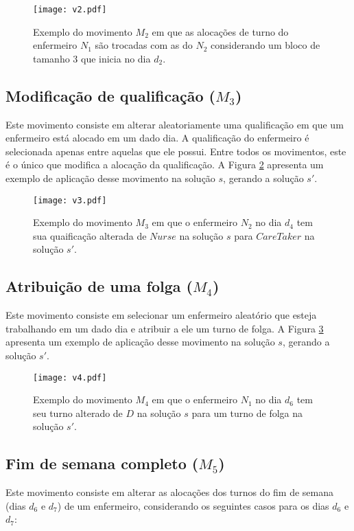 \documentclass[cic,tc, twoside]{iiufrgs}
\begin{document}
\begin{figure}[ht!]
\texttt{[image: v2.pdf]}
\centering
\caption{Exemplo do movimento $M_2$ em que as alocações de turno do enfermeiro $N_1$ são trocadas com as do $N_2$ considerando um bloco 
de tamanho 3 que inicia no dia $d_2$.} 
\label{fig:vizinhanca2}
\end{figure}

\subsection{Modificação de qualificação ($M_3$)}

Este movimento consiste em alterar aleatoriamente uma qualificação em que um enfermeiro está alocado em um dado dia.
A qualificação do enfermeiro é selecionada apenas entre aquelas que ele possui. Entre todos os movimentos, este é o único que modifica a alocação da qualificação. A Figura \ref{fig:vizinhanca3} apresenta um exemplo de aplicação desse movimento na solução $s$, gerando a solução $s'$. 


\begin{figure}[ht!]
\texttt{[image: v3.pdf]}
\centering
\caption{Exemplo do movimento $M_3$ em que o enfermeiro $N_2$ no dia $d_4$ tem sua quaificação alterada de $Nurse$ na solução $s$ para $CareTaker$ na solução $s'$.}
\label{fig:vizinhanca3}
\end{figure}

\subsection{Atribuição de uma folga ($M_4$)}
Este movimento consiste em selecionar um enfermeiro aleatório que esteja trabalhando em um dado dia e atribuir a ele um turno de folga.
A Figura \ref{fig:vizinhanca4} apresenta um exemplo de aplicação desse movimento na solução $s$, gerando a solução $s'$. 

\begin{figure}[ht!]
\texttt{[image: v4.pdf]}
\centering
\caption{Exemplo do movimento $M_4$ em que o enfermeiro $N_1$ no dia $d_6$ tem seu turno alterado de $D$ na solução $s$ para um turno de folga na solução $s'$.} 
\label{fig:vizinhanca4}
\end{figure}

\subsection{Fim de semana completo ($M_5$)}
Este movimento consiste em alterar as alocações dos turnos do fim de semana (dias $d_6$ e $d_7$) de um enfermeiro, considerando os seguintes casos para os dias $d_6$ e $d_7$:
\end{document}
